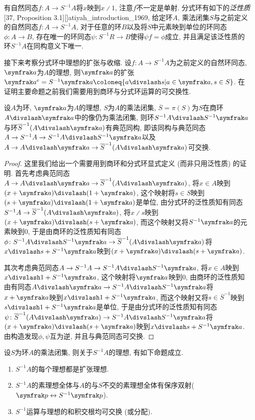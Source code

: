 有自然同态$f\colon A\to S^{-1}A$将$x$映到$x{\divslash}1$, 注意$f$不一定是单射. 分式环有如下的\emph{泛性质}[37, Proposition 3.1][]{atiyah_introduction_1969}, 给定环$A$, 乘法闭集$S$与之前定义的自然同态$f\colon A\to S^{-1}A$, 对于任意的环$B$以及将$S$中元素映到单位的环同态$\phi\colon A\to B$, 存在唯一的环同态$\psi\colon S^{-1}R\to B$使得$\psi f=\phi$成立, 并且满足该泛性质的环$S^{-1}A$在同构意义下唯一.

接下来考察分式环中理想的扩张与收缩. 设$f\colon A\to S^{-1}A$为之前定义的自然环同态, $\ideal{a}$为$A$的理想, 则$\ideal{a}$的扩张$\ideal{a}^e=S^{-1}\ideal{a}\coloneq \{a{\divslash}s\vert a\in\ideal{a}, s\in S\}$. 在证明主要命题之前我们需要用到商环与分式环运算的可交换性.

\begin{proposition}\label{prop:localizationquotientcommute}
  设$A$为环, $\ideal{a}$为$A$的理想, $S$为$A$的乘法闭集, $\overline{S}=\pi(S)$为$S$在商环$A{\divslash}\ideal{a}$中的像仍为乘法闭集, 则环$\SASa$与环$\SAa$有典范同构, 即该同构与典范同态$A\to S^{-1}A\to \SASa$以及$A\to A{\divslash}\ideal{a}\to \SAa$可交换.
\end{proposition}

\begin{proof}
  这里我们给出一个需要用到商环和分式环显式定义 (而非只用泛性质) 的证明. 首先考虑典范同态$A\to A{\divslash}\ideal{a}\to \SAa$, 将$x\in A$映到$(x+\ideal{a}){\divslash}(1+\ideal{a})$, 这个映射将$s\in S$映到$(s+\ideal{a}){\divslash}(1+\ideal{a})$是单位, 由分式环的泛性质知有同态$S^{-1}A\to \SAa$, 将$x{\divslash}s$映到$(x+\ideal{a}){\divslash}(s+\ideal{a})$, 而这个映射又将$S^{-1}\ideal{a}$的元素映到0, 于是由商环的泛性质知有同态$\phi\colon\SASa\to\SAa$将$x{\divslash}s + S^{-1}\ideal{a}$映到$(x+\ideal{a}){\divslash}(s+\ideal{a})$.

  其次考虑典范同态$A\to S^{-1}A\to\SASa$, 将$x\in A$映到$x{\divslash}1+S^{-1}\ideal{a}$, 这个映射将$\ideal{a}$映到0, 由商环的泛性质知由有同态$A{\divslash}\ideal{a}\to\SASa$将$x+\ideal{a}$映到$x{\divslash}1+S^{-1}\ideal{a}$, 而这个映射又将$s\in\overline{S}^{-1}$映到$s{\divslash}1+S^{-1}\ideal{a}$是单位, 于是由分式环的泛性质知有同态$\psi\colon\SAa\to\SASa$将$(x+\ideal{a}){\divslash}(s+\ideal{a})$映到$x{\divslash}s + S^{-1}\ideal{a}$. 由构造发现$\phi, \psi$互为逆, 并且与典范同态可交换.
\end{proof}

\begin{proposition}\label{prop:fracideal}
  设$S$为环$A$的乘法闭集, 则关于$S^{-1}A$的理想, 有如下命题成立.
  \begin{enumerate}
    \item\label{enum:prop-fracideal-1} $S^{-1}A$的每个理想都是扩张理想.
    \item\label{enum:prop-fracideal-2} $S^{-1}A$的素理想全体与$A$的与$S$不交的素理想全体有保序双射($\ideal{p}\leftrightarrow S^{-1}\ideal{p}$).
    \item\label{enum:prop-fracideal-3} $S^{-1}$运算与理想的和积交根均可交换 (或分配).
  \end{enumerate}
\end{proposition}


